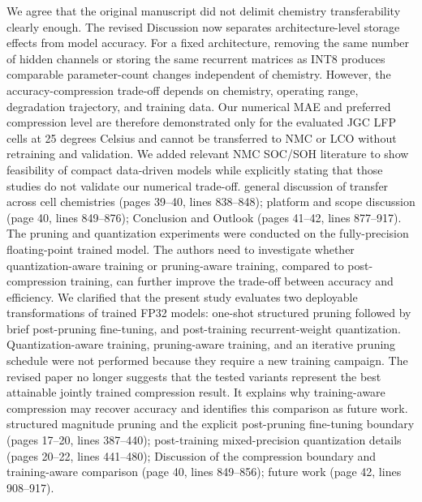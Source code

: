 {} We agree that the original manuscript did not delimit chemistry transferability clearly enough. The revised Discussion now separates architecture-level storage effects from model accuracy. For a fixed architecture, removing the same number of hidden channels or storing the same recurrent matrices as INT8 produces comparable parameter-count changes independent of chemistry. However, the accuracy-compression trade-off depends on chemistry, operating range, degradation trajectory, and training data. Our numerical MAE and preferred compression level are therefore demonstrated only for the evaluated JGC LFP cells at 25 degrees Celsius and cannot be transferred to NMC or LCO without retraining and validation. We added relevant NMC SOC/SOH literature to show feasibility of compact data-driven models while explicitly stating that those studies do not validate our numerical trade-off.\markdownRendererParagraphSeparator
{} general discussion of transfer across cell chemistries (pages 39--40, lines 838--848); platform and scope discussion (page 40, lines 849--876); Conclusion and Outlook (pages 41--42, lines 877--917).\markdownRendererInterblockSeparator
{}
\markdownRendererSectionEnd \markdownRendererSectionBegin
{}\markdownRendererInterblockSeparator
{}\markdownRendererBlockQuoteBegin
The pruning and quantization experiments were conducted on the fully-precision floating-point trained model. The authors need to investigate whether quantization-aware training or pruning-aware training, compared to post-compression training, can further improve the trade-off between accuracy and efficiency.\markdownRendererBlockQuoteEnd \markdownRendererInterblockSeparator
{} We clarified that the present study evaluates two deployable transformations of trained FP32 models: one-shot structured pruning followed by brief post-pruning fine-tuning, and post-training recurrent-weight quantization. Quantization-aware training, pruning-aware training, and an iterative pruning schedule were not performed because they require a new training campaign. The revised paper no longer suggests that the tested variants represent the best attainable jointly trained compression result. It explains why training-aware compression may recover accuracy and identifies this comparison as future work.\markdownRendererParagraphSeparator
{} structured magnitude pruning and the explicit post-pruning fine-tuning boundary (pages 17--20, lines 387--440); post-training mixed-precision quantization details (pages 20--22, lines 441--480); Discussion of the compression boundary and training-aware comparison (page 40, lines 849--856); future work (page 42, lines 908--917).\markdownRendererInterblockSeparator
